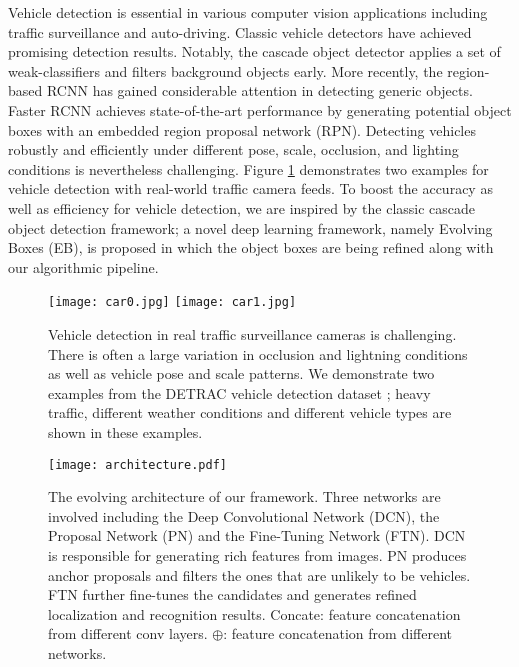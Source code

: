 \documentclass[5pt]{article}
\begin{document}
Vehicle detection is essential in various computer vision applications including traffic surveillance \cite{lu2016optasia} and auto-driving. Classic vehicle detectors \cite{viola2001rapid,felzenszwalb2010object} have achieved promising detection results. Notably, the cascade object detector \cite{viola2001rapid} applies a set of weak-classifiers and filters background objects early. More recently, the region-based RCNN \cite{girshick2014rich} has gained considerable attention in detecting generic objects. Faster RCNN \cite{renNIPS15fasterrcnn} achieves state-of-the-art performance by generating potential object boxes with an embedded region proposal network (RPN). Detecting vehicles robustly and efficiently under different pose, scale, occlusion, and lighting conditions is nevertheless challenging. Figure \ref{fig:gt_face} demonstrates two examples for vehicle detection with real-world traffic camera feeds. To boost the accuracy as well as efficiency for vehicle detection, we are inspired by the classic cascade object detection framework; a novel deep learning framework, namely Evolving Boxes (EB), is proposed in which the object boxes are being refined along with our algorithmic pipeline.

\begin{figure}[t]
  \centering
  \texttt{[image: car0.jpg]}
  \texttt{[image: car1.jpg]}
  \caption{Vehicle detection in real traffic surveillance cameras is challenging. There is often a large variation in occlusion and lightning conditions as well as vehicle pose and scale patterns. We demonstrate two examples from the DETRAC vehicle detection dataset \cite{DETRAC:CoRR:WenDCLCQLYL15}; heavy traffic, different weather conditions and different vehicle types are shown in these examples.  }
  \label{fig:gt_face}
  \vspace{-0.15in}
\end{figure}

\begin{figure*}[t]
  \centering
  \texttt{[image: architecture.pdf]}
  \caption{The evolving architecture of our framework. Three networks are involved including the Deep Convolutional Network (DCN), the Proposal Network (PN) and the Fine-Tuning Network (FTN). DCN is responsible for generating rich features from images. PN produces anchor proposals and filters the ones that are unlikely to be vehicles. FTN further fine-tunes the candidates and generates refined localization and recognition results. Concate: feature concatenation from different conv layers.    $\oplus$: feature concatenation from different networks. }
  \vspace{-0.1in}
  \label{fig:architecture}
\end{figure*}
\end{document}
